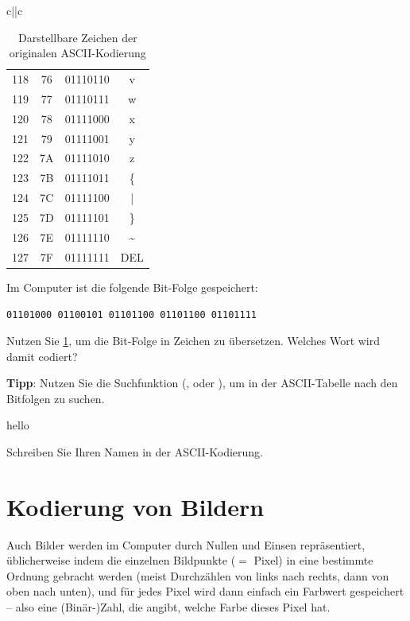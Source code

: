 \begin{table}[H]
{\begin{tabular}{c||c}
\begin{tabular}{cccc}
				118     & 76          & 01110110 & v               \\
				119     & 77          & 01110111 & w               \\
				120     & 78          & 01111000 & x               \\
				121     & 79          & 01111001 & y               \\
				122     & 7A          & 01111010 & z               \\
				123     & 7B          & 01111011 & \{              \\
				124     & 7C          & 01111100 & |               \\
				125     & 7D          & 01111101 & \}              \\
				126     & 7E          & 01111110 & \textasciitilde \\
				127     & 7F          & 01111111 & DEL             \\
				\bottomrule
			\end{tabular}
		\end{tabular}}
	\caption{Darstellbare Zeichen der originalen \gls{ASCII}-Kodierung}
	\label{table:ascii}
\end{table}
\clearpage

\begin{myexercise}
	Im Computer ist die folgende Bit-Folge gespeichert:

	\texttt{01101000 01100101 01101100 01101100 01101111}

	Nutzen Sie \cref{table:ascii}, um die Bit-Folge in Zeichen zu übersetzen. Welches Wort wird damit codiert?

	\textbf{Tipp}: Nutzen Sie die Suchfunktion (, oder ), um in der ASCII-Tabelle nach den Bitfolgen zu suchen.
	\begin{myanswer}
		hello
	\end{myanswer}
\end{myexercise}

\begin{myexercise}
	Schreiben Sie Ihren Namen in der \gls{ASCII}-Kodierung.
\end{myexercise}

\section{Kodierung von Bildern}

Auch Bilder werden im Computer durch Nullen und Einsen repräsentiert, üblicherweise indem die einzelnen Bildpunkte ($=$ Pixel) in eine bestimmte Ordnung gebracht werden (meist Durchzählen von links nach rechts, dann von oben nach unten), und für jedes Pixel wird dann einfach ein Farbwert gespeichert -- also eine (Binär-)Zahl, die angibt, welche Farbe dieses Pixel hat.

